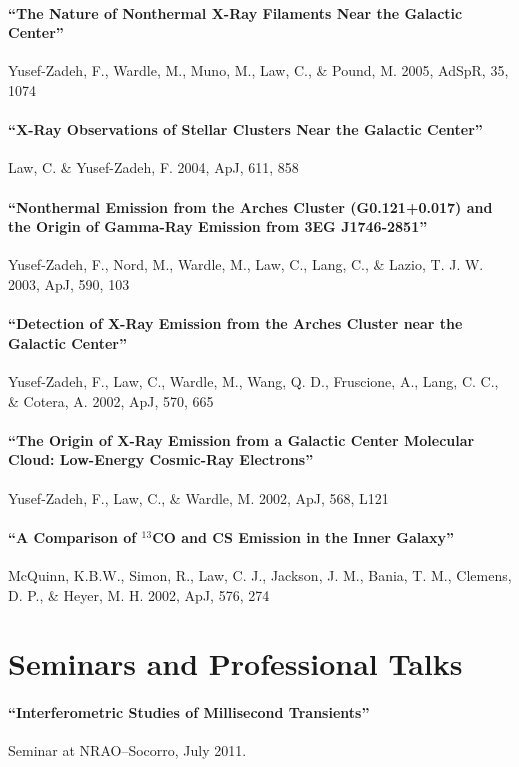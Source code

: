 \documentclass[12pt]{article}
\begin{document}
\paragraph{``The Nature of Nonthermal X-Ray Filaments Near the Galactic Center''} Yusef-Zadeh, F., Wardle, M., Muno, M., Law, C., \& Pound, M. 2005, AdSpR, 35, 1074

\paragraph{``X-Ray Observations of Stellar Clusters Near the Galactic Center''} Law, C. \& Yusef-Zadeh, F. 2004, ApJ, 611, 858

\paragraph{``Nonthermal Emission from the Arches Cluster (G0.121+0.017) and the Origin of Gamma-Ray Emission from 3EG J1746-2851''} Yusef-Zadeh, F., Nord, M., Wardle, M., Law, C., Lang, C., \& Lazio, T. J. W. 2003, ApJ, 590, 103

\paragraph{``Detection of X-Ray Emission from the Arches Cluster near the Galactic Center''} Yusef-Zadeh, F., Law, C., Wardle, M., Wang, Q. D., Fruscione, A., Lang, C. C., \& Cotera, A. 2002, ApJ, 570, 665

\paragraph{``The Origin of X-Ray Emission from a Galactic Center Molecular Cloud:  Low-Energy Cosmic-Ray Electrons''} Yusef-Zadeh, F., Law, C., \& Wardle, M. 2002, ApJ, 568, L121

\paragraph{``A Comparison of $^{13}$CO and CS Emission in the Inner Galaxy''} McQuinn, K.B.W., Simon, R., Law, C. J., Jackson, J. M., Bania, T. M., Clemens, D. P., \& Heyer, M. H. 2002, ApJ, 576, 274

\section{Seminars and Professional Talks}
\indent

\paragraph{``Interferometric Studies of Millisecond Transients''} Seminar at NRAO--Socorro, July 2011.
\end{document}
